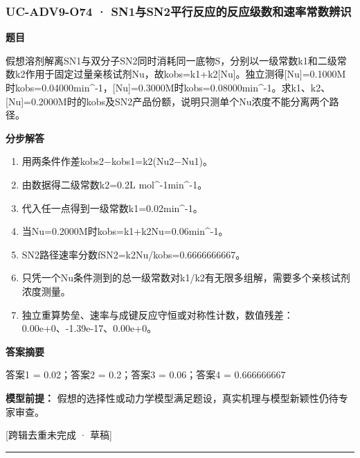 \documentclass[UTF8,11pt,a4paper]{ctexart}
\begin{document}
\subsubsection*{UC-ADV9-O74 · SN1与SN2平行反应的反应级数和速率常数辨识}
\noindent\textbf{题目}\par
假想溶剂解离SN1与双分子SN2同时消耗同一底物S，分别以一级常数k1和二级常数k2作用于固定过量亲核试剂Nu，故kobs=k1+k2[Nu]。独立测得[Nu]=0.1000M时kobs=0.04000min\textasciicircum{}-1，[Nu]=0.3000M时kobs=0.08000min\textasciicircum{}-1。求k1、k2、[Nu]=0.2000M时的kobs及SN2产品份额，说明只测单个Nu浓度不能分离两个路径。\par
\medskip\noindent\textbf{分步解答}
\begin{enumerate}
\item 用两条件作差kobs2−kobs1=k2(Nu2−Nu1)。
\item 由数据得二级常数k2=0.2L mol\textasciicircum{}-1min\textasciicircum{}-1。
\item 代入任一点得到一级常数k1=0.02min\textasciicircum{}-1。
\item 当Nu=0.2000M时kobs=k1+k2Nu=0.06min\textasciicircum{}-1。
\item SN2路径速率分数fSN2=k2Nu/kobs=0.6666666667。
\item 只凭一个Nu条件测到的总一级常数对k1/k2有无限多组解，需要多个亲核试剂浓度测量。
\item 独立重算势垒、速率与成键反应守恒或对称性计数，数值残差：0.00e+0、-1.39e-17、0.00e+0。
\end{enumerate}
\noindent\textbf{答案摘要}\par
答案1 = 0.02；答案2 = 0.2；答案3 = 0.06；答案4 = 0.666666667\par
\noindent\textbf{模型前提：}
假想的选择性或动力学模型满足题设，真实机理与模型新颖性仍待专家审查。\par
\noindent\textcolor{red!65!black}{[跨辑去重未完成 · 草稿]} \par
\medskip\hrule\medskip
{}
\end{document}
